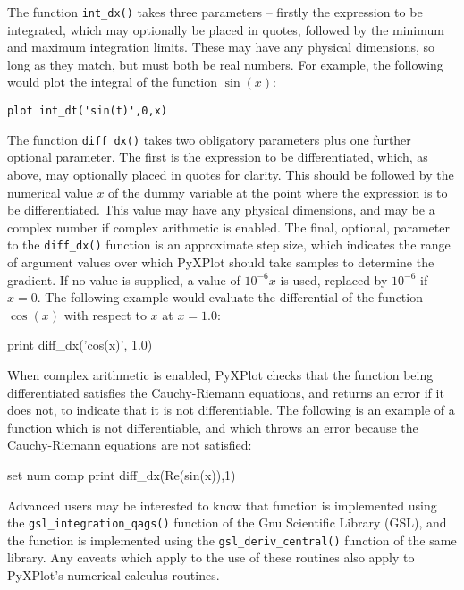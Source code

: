 The function {\tt int\_dx()} takes three parameters -- firstly the expression
to be integrated, which may optionally be placed in quotes, followed by the
minimum and maximum integration limits. These may have any physical dimensions,
so long as they match, but must both be real numbers. For example, the
following would plot the integral of the function $\sin(x)$:

\begin{verbatim}
plot int_dt('sin(t)',0,x)
\end{verbatim}

The function {\tt diff\_dx()} takes two obligatory parameters plus one further
optional parameter. The first is the expression to be differentiated, which,
as above, may optionally placed in quotes for clarity. This should be followed
by the numerical value $x$ of the dummy variable at the point where the
expression is to be differentiated. This value may have any physical
dimensions, and may be a complex number if complex arithmetic is enabled. The
final, optional, parameter to the {\tt diff\_dx()} function is an approximate
step size, which indicates the range of argument values over which PyXPlot
should take samples to determine the gradient. If no value is supplied, a value
of $10^{-6}x$ is used, replaced by $10^{-6}$ if $x=0$.  The following example
would evaluate the differential of the function $\cos(x)$ with respect to $x$
at $x=1.0$:

\begin{dodo}
print diff\_dx('cos(x)', 1.0)
\end{dodo}

When complex arithmetic is enabled, PyXPlot checks that the function being
differentiated satisfies the Cauchy-Riemann equations, and returns an error if
it does not, to indicate that it is not differentiable.  The following is an
example of a function which is not differentiable, and which throws an error
because the Cauchy-Riemann equations are not satisfied:

\begin{dontdo}
set num comp\newline
print diff\_dx(Re(sin(x)),1)
\end{dontdo}

Advanced users may be interested to know that  function is
implemented using the {\tt gsl\_\-integration\_\-qags()} function of the Gnu
Scientific Library (GSL), and the  function is
implemented using the {\tt gsl\_\-deriv\_\-central()} function of the same library.
Any caveats which apply to the use of these routines also apply to PyXPlot's
numerical calculus routines.

